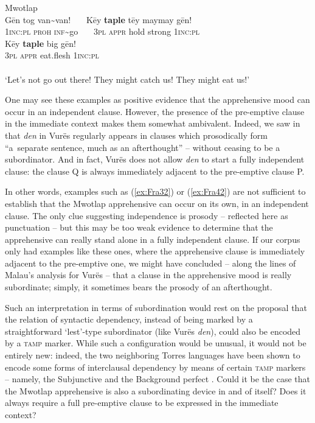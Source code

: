 \documentclass[output=paper,colorlinks,citecolor=brown]{langscibook}
\begin{document}
\ea \label{ex:Fra42} \textnormal{Mwotlap}  \\
\gll Gēn tog van\textasciitilde van! ~~~Kēy \textbf{taple} tēy maymay gēn!\\
\textsc{1inc:pl} \textsc{proh} \textsc{inf}\textasciitilde go ~~~\textsc{3pl} \textsc{appr} hold strong \textsc{1inc:pl} \\
\gll Kēy \textbf{taple} big gēn! \\
\textsc{3pl} \textsc{appr} eat.flesh \textsc{1inc:pl} \\
 \\
`Let's not go out there! They might catch us! They might eat us!' 
\z


One may see these examples as positive evidence that the apprehensive mood can occur in an independent clause. However, the presence of the pre-emptive clause in the immediate context makes them somewhat ambivalent. Indeed, we saw in  that \textit{den} in Vurës regularly appears in clauses which prosodically form ``a~separate sentence, much as an afterthought'' \citep[679]{Malau2016} -- without ceasing to be a subordinator. And in fact, Vurës does not allow \textit{den} to start a fully independent clause: the clause Q is always immediately adjacent to the pre-emptive clause P.

In other words, examples such as (\ref{ex:Fra32}) or (\ref{ex:Fra42}) are not sufficient to establish that the Mwotlap apprehensive can occur on its own, in an independent clause. The only clue suggesting independence is prosody -- reflected here as punctuation -- but this may be too weak evidence to determine that the apprehensive can really stand alone in a fully independent clause. If our corpus only had examples like these ones, where the apprehensive clause is immediately adjacent to the pre-emptive one, we might have concluded -- along the lines of Malau's analysis for Vurës -- that a clause in the apprehensive mood is really subordinate; simply, it sometimes bears the prosody of an afterthought. 

Such an interpretation in terms of subordination would rest on the proposal that the relation of syntactic dependency, instead of being marked by a straightforward `lest'-type subordinator (like Vurës \textit{den}), could also be encoded by a \textsc{tamp} marker. While such a configuration would be unusual, it would not be entirely new: indeed, the two neighboring Torres languages have been shown to encode some forms of interclausal dependency by means of certain \textsc{tamp} markers -- namely, the Subjunctive and the Background perfect \citep{François2010}. Could it be the case that the Mwotlap apprehensive is also a subordinating device in and of itself? Does it always require a full pre-emptive clause to be expressed in the immediate context?
\end{document}
